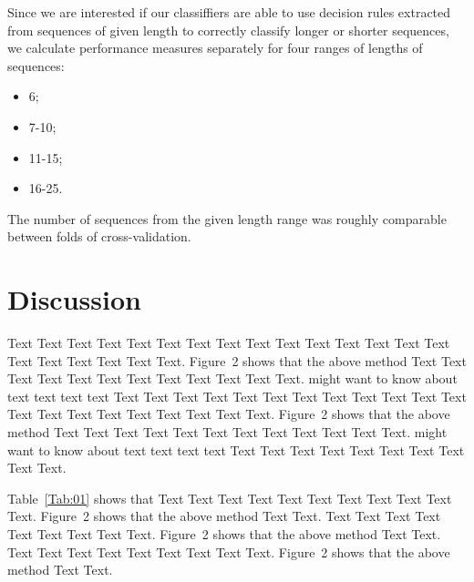 \documentclass{bioinfo}
\begin{document}
\begin{methods}
Since we are interested if our classiffiers are able to use decision rules extracted from sequences of given length to correctly classify longer or shorter sequences, we calculate performance measures separately for four ranges of lengths of sequences:  
\begin{itemize}
\item 6;  
\item 7-10;   
\item 11-15;   
\item 16-25.  
\end{itemize}
The number of sequences from the given length range was roughly comparable between folds of cross-validation.


\section{Discussion}

Text Text Text Text Text Text  Text Text Text Text Text Text Text
Text Text  Text Text Text Text Text Text.
Figure~2\vphantom{\ref{fig:02}} shows that the above method  Text
Text Text Text  Text Text Text Text Text Text  Text Text.
\citealp{Boffelli03} might want to know about  text text text text
Text Text Text Text Text Text  Text Text Text Text Text Text Text
Text Text  Text Text Text Text Text Text.
Figure~2\vphantom{\ref{fig:02}} shows that the above method  Text
Text Text Text  Text Text Text Text Text Text  Text Text.
\citealp{Boffelli03} might want to know about  text text text text
Text Text Text Text Text Text Text Text Text Text.




Table~\ref{Tab:01} shows that Text Text Text Text Text  Text Text
Text Text Text Text. Figure~2\vphantom{\ref{fig:02}} shows that
the above method Text Text. Text Text Text  Text Text Text Text
Text Text. Figure~2\vphantom{\ref{fig:02}} shows that the above
method Text Text. Text Text Text  Text Text Text Text Text Text.
Figure~2\vphantom{\ref{fig:02}} shows that the above method Text
Text.









%
%







\end{methods}
\end{document}
